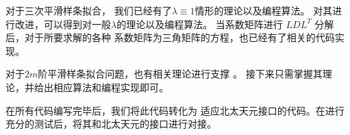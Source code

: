 对于三次平滑样条拟合，
我们已经有了$\lambda\equiv1$情形的理论以及编程算法。
对其进行改进，可以得到对一般$\lambda$的理论以及编程算法。
当系数矩阵进行 $LDL^{T}$ 分解后，对于所要求解的各种
系数矩阵为三角矩阵的方程，也已经有了相关的代码实现。

对于$2m$阶平滑样条拟合问题，也有相关理论进行支撑
\cite{Boor2001CALCULATIONOT,SmoothingBySplineFunctions}。
接下来只需掌握其理论，并给出相应算法和编程实现即可。

在所有代码编写完毕后，我们将此代码转化为
适应北太天元接口的代码。在进行充分的测试后，将其和北太天元的接口进行对接。
